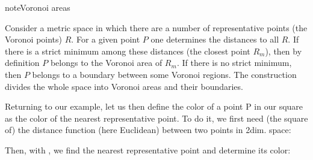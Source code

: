 \documentclass[a4paper,12pt,polish]{jupyterBook}
\begin{document}
\begin{sphinxadmonition}{note}{Voronoi areas}

\sphinxAtStartPar
Consider a metric space in which there are a number of representative points (the Voronoi points) \(R\). For a given point \(P\) one determines the distances to all \(R\). If there is a strict minimum among these distances (the closest point \(R_m\)), then by definition \(P\) belongs to the Voronoi area of \(R_m\). If there is no strict minimum, then \(P\) belongs to a boundary between some Voronoi regions. The construction divides the whole space into Voronoi areas and their boundaries.
\end{sphinxadmonition}

\sphinxAtStartPar
Returning to our example, let us then define the color of a point P in our square as the color of the nearest representative point. To do it, we first need (the square of) the distance function (here Euclidean) between two points in 2\sphinxhyphen{}dim. space:
\begin{sphinxVerbatimInput}

\begin{sphinxVerbatim}[commandchars=\\\{\}]
  
     \PYG{p}{[}\PYG{p}{]}\PYG{p}{[}\PYG{p}{]}\PYG{p}{[}\PYG{p}{]}\PYG{p}{[}\PYG{p}{]}
\end{sphinxVerbatim}
\end{sphinxVerbatimInput}

\sphinxAtStartPar
Then, with , we find the nearest representative point and determine its color:
\begin{sphinxVerbatimInput}

\begin{sphinxVerbatim}[commandchars=\\\{\}]
 
    \PYG{p}{[}\PYG{p}{]} 
                                
     \PYG{p}{[}\PYG{p}{]}                                
\end{sphinxVerbatim}
\end{sphinxVerbatimInput}
\end{document}
